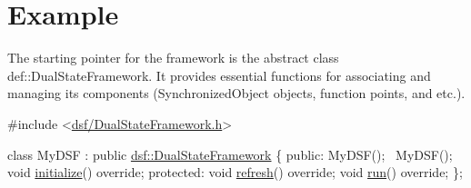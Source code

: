 \hypertarget{_example-example}{}\section{Example}
The starting pointer for the framework is the abstract class def\+::\+Dual\+State\+Framework. It provides essential functions for associating and managing its components (Synchronized\+Object objects, function points, and etc.).


\begin{DoxyCode}
\textcolor{preprocessor}{#include <\hyperlink{_dual_state_framework_8h}{dsf/DualStateFramework.h}>}

\textcolor{keyword}{class }MyDSF : \textcolor{keyword}{public} \hyperlink{classdsf_1_1_dual_state_framework}{dsf::DualStateFramework}
\{
\textcolor{keyword}{public}:
    MyDSF();
    ~MyDSF();
    \textcolor{keywordtype}{void} \hyperlink{classdsf_1_1_dual_state_framework_a809a7bba4148e17ea9a43a0a035383ba}{initialize}() \textcolor{keyword}{override};
\textcolor{keyword}{protected}:
    \textcolor{keywordtype}{void} \hyperlink{classdsf_1_1_dual_state_framework_ab4c6856bd4036f8abbc2be2c0f00ea1a}{refresh}() \textcolor{keyword}{override};
    \textcolor{keywordtype}{void} \hyperlink{classdsf_1_1_dual_state_framework_a7b40bcf755127022f9258e846ddedb23}{run}() \textcolor{keyword}{override};
\};
\end{DoxyCode}



\begin{DoxyCodeInclude}
\end{DoxyCodeInclude}
 